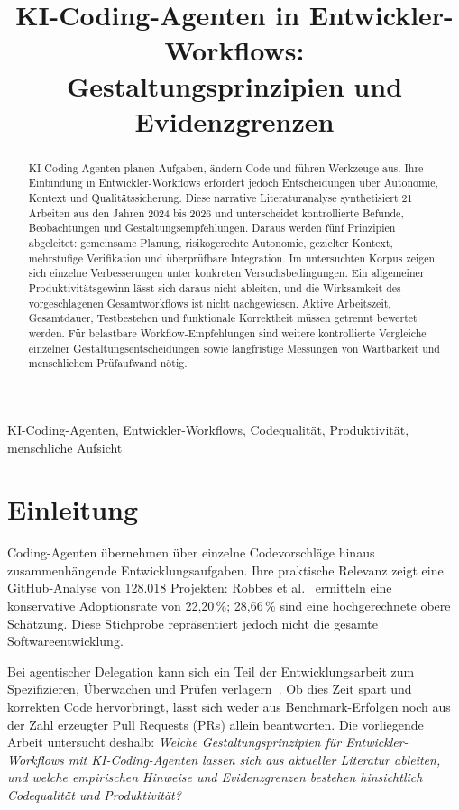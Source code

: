 \documentclass[conference]{IEEEtran}
\title{KI-Coding-Agenten in Entwickler-Workflows:\\Gestaltungsprinzipien und Evidenzgrenzen}
\author{\IEEEauthorblockN{Anonymisierte Fassung}}
\author{
\IEEEauthorblockN{Matej Vidakovic}
\IEEEauthorblockA{Informatik\\Duale Hochschule Baden-Württemberg}
\and
\IEEEauthorblockN{Malik Haase}
\IEEEauthorblockA{Informatik\\Duale Hochschule Baden-Württemberg}
\and
\IEEEauthorblockN{Sergiu Paculea}
\IEEEauthorblockA{Informatik\\Duale Hochschule Baden-Württemberg}}
\begin{document}
\maketitle
\begin{abstract}
KI-Coding-Agenten planen Aufgaben, ändern Code und führen Werkzeuge aus. Ihre Einbindung in Entwickler-Workflows erfordert jedoch Entscheidungen über Autonomie, Kontext und Qualitätssicherung. Diese narrative Literaturanalyse synthetisiert 21 Arbeiten aus den Jahren 2024 bis 2026 und unterscheidet kontrollierte Befunde, Beobachtungen und Gestaltungsempfehlungen. Daraus werden fünf Prinzipien abgeleitet: gemeinsame Planung, risikogerechte Autonomie, gezielter Kontext, mehrstufige Verifikation und überprüfbare Integration. Im untersuchten Korpus zeigen sich einzelne Verbesserungen unter konkreten Versuchsbedingungen. Ein allgemeiner Produktivitätsgewinn lässt sich daraus nicht ableiten, und die Wirksamkeit des vorgeschlagenen Gesamtworkflows ist nicht nachgewiesen. Aktive Arbeitszeit, Gesamtdauer, Testbestehen und funktionale Korrektheit müssen getrennt bewertet werden. Für belastbare Workflow-Empfehlungen sind weitere kontrollierte Vergleiche einzelner Gestaltungsentscheidungen sowie langfristige Messungen von Wartbarkeit und menschlichem Prüfaufwand nötig.
\end{abstract}
\begin{IEEEkeywords}
KI-Coding-Agenten, Entwickler-Workflows, Codequalität, Produktivität, menschliche Aufsicht
\end{IEEEkeywords}

\section{Einleitung}
Coding-Agenten übernehmen über einzelne Codevorschläge hinaus zusammenhängende Entwicklungsaufgaben. Ihre praktische Relevanz zeigt eine GitHub-Analyse von 128.018 Projekten: Robbes et al.~\cite{robbes2026agenticmuch} ermitteln eine konservative Adoptionsrate von 22,20\,\%; 28,66\,\% sind eine hochgerechnete obere Schätzung. Diese Stichprobe repräsentiert jedoch nicht die gesamte Softwareentwicklung.

Bei agentischer Delegation kann sich ein Teil der Entwicklungsarbeit zum Spezifizieren, Überwachen und Prüfen verlagern~\cite{dhanorkar2026oversight}. Ob dies Zeit spart und korrekten Code hervorbringt, lässt sich weder aus Benchmark-Erfolgen noch aus der Zahl erzeugter Pull Requests (PRs) allein beantworten. Die vorliegende Arbeit untersucht deshalb:
\emph{Welche Gestaltungsprinzipien für Entwickler-Workflows mit KI-Coding-Agenten lassen sich aus aktueller Literatur ableiten, und welche empirischen Hinweise und Evidenzgrenzen bestehen hinsichtlich Codequalität und Produktivität?}
\end{document}

